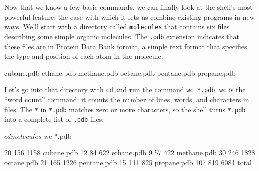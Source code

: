 \documentclass{book}
\begin{document}
Now that we know a few basic commands, we can finally look at the
shell's most powerful feature: the ease with which it lets us combine
existing programs in new ways. We'll start with a directory called
\texttt{molecules} that contains six files describing some simple
organic molecules. The \texttt{.pdb} extension indicates that these
files are in Protein Data Bank format, a simple text format that
specifies the type and position of each atom in the molecule.


\begin{VerbOut}
cubane.pdb    ethane.pdb    methane.pdb
octane.pdb    pentane.pdb   propane.pdb
\end{VerbOut}

Let's go into that directory with \texttt{cd} and run the command
\texttt{wc *.pdb}. \texttt{wc} is the ``word count'' command: it counts
the number of lines, words, and characters in files. The \texttt{*} in
\texttt{*.pdb} matches zero or more characters, so the shell turns
\texttt{*.pdb} into a complete list of \texttt{.pdb} files:

\begin{VerbIn}
$ cd molecules
$ wc *.pdb
\end{VerbIn}

\begin{VerbOut}
  20  156 1158 cubane.pdb
  12   84  622 ethane.pdb
   9   57  422 methane.pdb
  30  246 1828 octane.pdb
  21  165 1226 pentane.pdb
  15  111  825 propane.pdb
 107  819 6081 total
\end{VerbOut}
\end{document}
